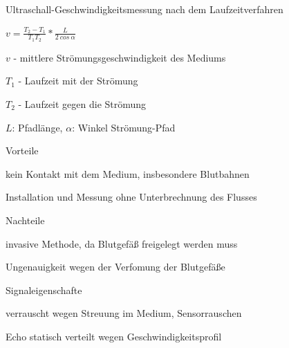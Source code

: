 \documentclass[a4paper]{article}
\begin{document}
\begin{multicols}{3}
  Ultraschall-Geschwindigkeitsmessung nach dem Laufzeitverfahren
  \begin{itemize*}
    \item $v=\frac{T_2-T_1}{T_1 T_2}*\frac{L}{2\ cos\ \alpha}$
    \item $v$ - mittlere Strömungsgeschwindigkeit des Mediums
    \item $T_1$ - Laufzeit mit der Strömung
    \item $T_2$ - Laufzeit gegen die Strömung
    \item $L$: Pfadlänge, $\alpha$: Winkel Strömung-Pfad
    \item Vorteile
    \begin{itemize*}
      \item kein Kontakt mit dem Medium, insbesondere Blutbahnen
      \item Installation und Messung ohne Unterbrechnung des Flusses
    \end{itemize*}
    \item Nachteile
    \begin{itemize*}
      \item invasive Methode, da Blutgefäß freigelegt werden muss
      \item Ungenauigkeit wegen der Verfomung der Blutgefäße
    \end{itemize*}
    \item Signaleigenschafte
    \begin{itemize*}
      \item verrauscht wegen Streuung im Medium, Sensorrauschen
      \item Echo statisch verteilt wegen Geschwindigkeitsprofil
    \end{itemize*}
  \end{itemize*}


\end{multicols}
\end{document}
